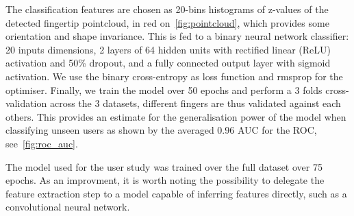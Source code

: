 \documentclass{chi-ext}
\begin{document}
The classification features are chosen as 20-bins histograms of z-values of the detected fingertip pointcloud, in red on~\autoref{fig:pointcloud}, which provides some orientation and shape invariance. This is fed to a binary neural network classifier: 20 inputs dimensions, 2 layers of 64 hidden units with rectified linear (ReLU) activation and 50\% dropout, and a fully connected output layer with sigmoid activation. We use the binary cross-entropy as loss function and rmsprop for the optimiser. Finally, we train the model over 50 epochs and perform a 3 folds cross-validation across the 3 datasets, different fingers are thus validated against each others. This provides an estimate for the generalisation power of the model when classifying unseen users as shown by the averaged 0.96 AUC for the ROC, see~\autoref{fig:roc_auc}.

The model used for the user study was trained over the full dataset over 75 epochs. As an improvment, it is worth noting the possibility to delegate the feature extraction step to a model capable of inferring features directly, such as a convolutional neural network.

\end{document}
